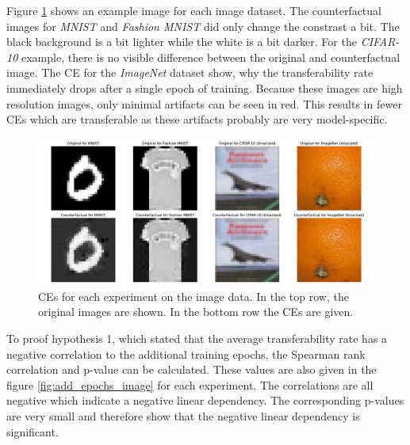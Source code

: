 \documentclass{article}
\begin{document}
Figure \ref{fig:examples_image} shows an example image for each image dataset. The counterfactual images for \textit{MNIST} and \textit{Fashion MNIST} did only change the constrast a bit. The black background is a bit lighter while the white is a bit darker. For the \textit{CIFAR-10} example, there is no visible difference between the original and counterfactual image. The CE for the \textit{ImageNet} dataset show, why the transferability rate immediately drops after a single epoch of training. Because these images are high resolution images, only minimal artifacts can be seen in red. This results in fewer CEs which are transferable as these artifacts probably are very model-specific.\\
\begin{figure}[h]
    \centering
    \includegraphics[width=\linewidth]{abb/counterfactual_examples.pdf}
    
    \caption{CEs for each experiment on the image data. In the top row, the original images are shown. In the bottom row the CEs are given.}
    \label{fig:examples_image}
\end{figure}
\noindent
To proof hypothesis 1, which stated that the average transferability rate has a negative correlation to the additional training epochs, the Spearman rank correlation and p-value can be calculated. These values are also given in the figure \ref{fig:add_epochs_image} for each experiment. The correlations are all negative which indicate a negative linear dependency. The corresponding p-values are very small and therefore show that the negative linear dependency is significant. \\
\end{document}
